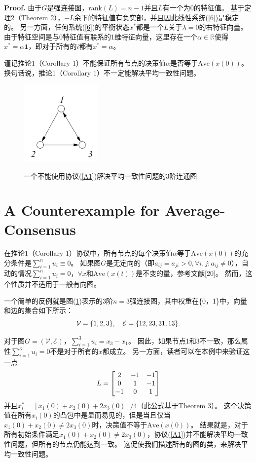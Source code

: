 \documentclass{article}
\begin{document}
\textbf{Proof.} 由于$G$是强连接图，$\text{rank}(L)=n-1$并且$L$有一个为0的特征值。
基于定理2（Theorem 2），$-L$余下的特征值有负实部，并且因此线性系统(\ref{6})是稳定的。
另一方面，任何系统(\ref{6})的平衡状态$x^*$都是一个$L$关于$\lambda=0$的右特征向量。
由于特征空间是与0特征值有联系的1维特征向量，这里存在一个$\alpha\in \mathbb{R}$使得$x^*=\alpha\mathbf{1}$，即对于所有的$i$都有$x^*=\alpha$。

谨记推论1（Corollary 1）不能保证所有节点的决策值$\alpha$是否等于$\text{Ave}(x(0))$。
换句话说，推论1（Corollary 1）不一定能解决平均一致性问题。
\begin{figure}[htbp]
    \centering
    \includegraphics[width=4cm]{figures/Fig2-ConnectedDigraph.jpeg}
    \label{ConnectedDigraph}
    \caption{一个不能使用协议(\ref{A1})解决平均一致性问题的3阶连通图}
\end{figure}


\section{A Counterexample for Average-Consensus}
在推论1（Corollary 1）协议中，所有节点的每个决策值$\alpha$等于$\text{Ave}(x(0))$的充分条件是$\sum_{i=1}^{n}u_i \equiv 0$。
如果图$G$是无定向的（即$a_{ij}=a_{ji} > 0,\forall i,j: a_{ij}\ne 0$），自动的情况$\sum_{i=1}^{n}u_i=0$，$\forall x$和$\text{Ave}(x(t))$是不变的量，参考文献[20]。
然而，这个性质并不适用于一般有向图。

一个简单的反例就是图(\ref{ConnectedDigraph})表示的3阶$n=3$强连接图，其中权重在\{0，1\}中，向量和边的集合如下所示：
\begin{equation}
    \mathcal{V} = \{1, 2, 3 \},\quad \mathcal{E}=\{12, 23, 31, 13\}.
    \notag
\end{equation}

对于图$G=(\mathcal{V}, \mathcal{E})$，$\sum_{i=1}^{3}u_i = x_3 - x_1$。
因此，如果节点1和3不一致，那么属性$\sum_{i=1}^{3}u_i = 0$不是对于所有的$x$都成立。
另一方面，读者可以在本例中来验证这一点
\begin{equation}
    L = \left[
    \begin{matrix}
        2 & -1 & -1 \\
        0 & 1 & -1 \\
        -1 & 0 & 1 
    \end{matrix}
    \right]
    \notag
\end{equation}
并且$x^*_i = [x_1(0) + x_2(0) + 2x_3(0)]/4$（此公式基于Theorem 3）。
这个决策值在所有$x_i(0)$的凸包中是显而易见的，但是当且仅当$x_1(0) + x_2(0) \ne 2x_3(0)$时，决策值不等于$\text{Ave}(x(0))$。
结果就是，对于所有初始条件满足$x_1(0) + x_2(0) \ne 2x_3(0)$，协议(\ref{A1})并不能解决平均一致性问题，但所有的节点仍能达到一致。
这促使我们描述所有的图的类，来解决平均一致性问题。
\end{document}
